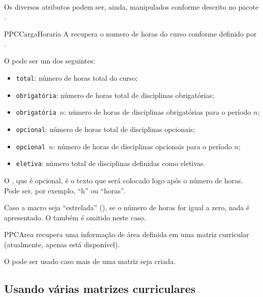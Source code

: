 \documentclass[a4paper, 11pt]{article}
\begin{document}
Os diversos atributos podem ser, ainda, manipulados conforme descrito no pacote .

\begin{Macrodef}{PPCCargaHoraria}{}{}
    A  recupera o numero de horas do curso conforme definido por .

    O  pode ser um dos seguintes:
    \begin{itemize}
        \item \texttt{total}: número de horas total do curso;
        \item \texttt{obrigatória}: número de horas total de disciplinas obrigatórias;
        \item \texttt{obrigatória $n$}: número de horas de disciplinas obrigatórias para o período $n$;
        \item \texttt{opcional}: número de horas total de disciplinas opcionais;
        \item \texttt{opcional $n$}: número de horas de disciplinas opcionais para o período $n$;
        \item \texttt{eletiva}: número total de disciplinas definidas como eletivas.
    \end{itemize}

    O , que é opcional, é o texto que será colocado logo após o número de horas. Pode ser, por exemplo, ``\Macro{,}h'' ou ``\PDTilde horas''.

    Caso a macro seja ``estrelada'' (), se o número de horas for igual a zero, nada é apresentado. O  também é omitido neste caso.
\end{Macrodef}

\begin{Macrodef}{PPCArea}{}{}
     recupera uma informação de área  definida em uma matriz curricular (atualmente, apenas  está disponível).

    O  pode ser usado caso mais de uma matriz seja criada.
\end{Macrodef}

\subsection{Usando várias matrizes curriculares}
\end{document}
